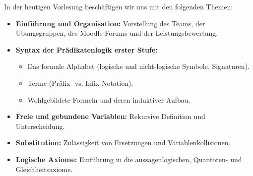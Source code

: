 



\begin{nice-box}
In der heutigen Vorlesung beschäftigen wir uns mit den folgenden Themen:
\begin{itemize}
    \item \textbf{Einführung und Organisation:} Vorstellung des Teams, der Übungsgruppen, des Moodle-Forums und der Leistungsbewertung.
    \item \textbf{Syntax der Prädikatenlogik erster Stufe:}
    \begin{itemize}
        \item Das formale Alphabet (logische und nicht-logische Symbole, Signaturen).
        \item Terme (Präfix- vs. Infix-Notation).
        \item Wohlgebildete Formeln und deren induktiver Aufbau.
    \end{itemize}
    \item \textbf{Freie und gebundene Variablen:} Rekursive Definition und Unterscheidung.
    \item \textbf{Substitution:} Zulässigkeit von Ersetzungen und Variablenkollisionen.
    \item \textbf{Logische Axiome:} Einführung in die aussagenlogischen, Quantoren- und Gleichheitsaxiome.
\end{itemize}
\end{nice-box}

